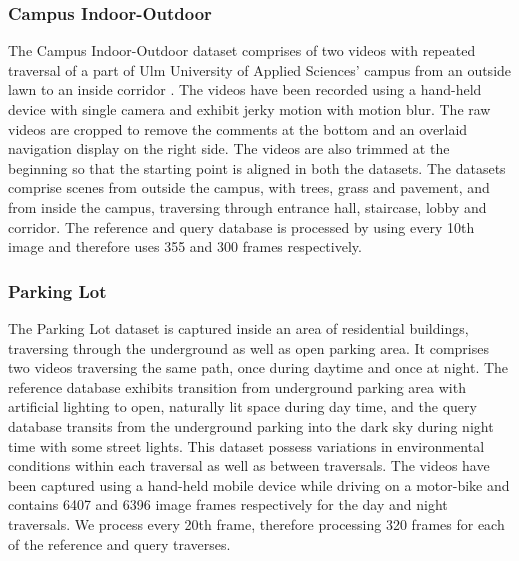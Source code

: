 \documentclass[letterpaper, 10 pt, conference]{ieeeconf}  %
\begin{document}
\subsubsection{Campus Indoor-Outdoor}
The Campus Indoor-Outdoor dataset comprises of two videos with repeated traversal of a part of Ulm University of Applied Sciences' campus from an outside lawn to an inside corridor \cite{indoorOutdoor1}. The videos have been recorded using a hand-held device with single camera and exhibit jerky motion with motion blur. The raw videos are cropped to remove the comments at the bottom and an overlaid navigation display on the right side. The videos are also trimmed at the beginning so that the starting point is aligned in both the datasets. The datasets comprise scenes from outside the campus, with trees, grass and pavement, and from inside the campus, traversing through entrance hall, staircase, lobby and corridor. The reference and query database is processed by using every 10th image and therefore uses 355 and 300 frames respectively.

\subsubsection{Parking Lot}
The Parking Lot dataset is captured inside an area of residential buildings, traversing through the underground as well as open parking area. It comprises two videos traversing the same path, once during daytime and once at night. The reference database exhibits transition from underground parking area with artificial lighting to open, naturally lit space during day time, and the query database transits from the underground parking into the dark sky during night time with some street lights. This dataset possess variations in environmental conditions within each traversal as well as between traversals. The videos have been captured using a hand-held mobile device while driving on a motor-bike and contains 6407 and 6396 image frames respectively for the day and night traversals. We process every 20th frame, therefore processing 320 frames for each of the reference and query traverses.
\end{document}
